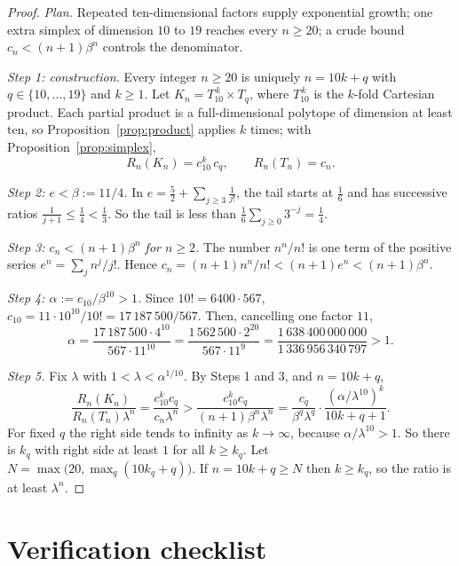 \documentclass[11pt]{article}
\begin{document}
\begin{proof}
\emph{Plan.} Repeated ten-dimensional factors supply exponential growth; one extra simplex of dimension \(10\) to \(19\) reaches every \(n\ge20\); a crude bound \(c_n<(n+1)\beta^n\) controls the denominator.

\emph{Step 1: construction.} Every integer \(n\ge20\) is uniquely \(n=10k+q\) with \(q\in\{10,\dots,19\}\) and \(k\ge1\). Let \(K_n=T_{10}^{\,k}\times T_q\), where \(T_{10}^{\,k}\) is the \(k\)-fold Cartesian product. Each partial product is a full-dimensional polytope of dimension at least ten, so Proposition~\ref{prop:product} applies \(k\) times; with Proposition~\ref{prop:simplex},
\[
 R_n(K_n)=c_{10}^k\,c_q,\qquad R_n(T_n)=c_n .
\]

\emph{Step 2: \(e<\beta:=11/4\).} In \(e=\frac52+\sum_{j\ge3}\frac1{j!}\), the tail starts at \(\frac16\) and has successive ratios \(\frac1{j+1}\le\frac14<\frac13\). So the tail is less than \(\frac16\sum_{j\ge0}3^{-j}=\frac14\).

\emph{Step 3: \(c_n<(n+1)\beta^n\) for \(n\ge2\).} The number \(n^n/n!\) is one term of the positive series \(e^n=\sum_jn^j/j!\). Hence \(c_n=(n+1)n^n/n!<(n+1)e^n<(n+1)\beta^n\).

\emph{Step 4: \(\alpha:=c_{10}/\beta^{10}>1\).} Since \(10!=6400\cdot567\), \(c_{10}=11\cdot10^{10}/10!=17\,187\,500/567\). Then, cancelling one factor \(11\),
\[
 \alpha=\frac{17\,187\,500\cdot4^{10}}{567\cdot11^{10}}
 =\frac{1\,562\,500\cdot2^{20}}{567\cdot11^{9}}
 =\frac{1\,638\,400\,000\,000}{1\,336\,956\,340\,797}>1 .
\]

\emph{Step 5.} Fix \(\lambda\) with \(1<\lambda<\alpha^{1/10}\). By Steps 1 and 3, and \(n=10k+q\),
\[
 \frac{R_n(K_n)}{R_n(T_n)\lambda^n}
 =\frac{c_{10}^kc_q}{c_n\lambda^n}
 >\frac{c_{10}^kc_q}{(n+1)\beta^n\lambda^n}
 =\frac{c_q}{\beta^q\lambda^q}\cdot
   \frac{(\alpha/\lambda^{10})^k}{10k+q+1}.
\]
For fixed \(q\) the right side tends to infinity as \(k\to\infty\), because \(\alpha/\lambda^{10}>1\). So there is \(k_q\) with right side at least \(1\) for all \(k\ge k_q\). Let \(N=\max\bigl(20,\max_q(10k_q+q)\bigr)\). If \(n=10k+q\ge N\) then \(k\ge k_q\), so the ratio is at least \(\lambda^n\).
\end{proof}

\section{Verification checklist}
\end{document}
